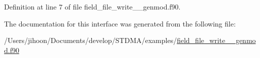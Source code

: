 Definition at line 7 of file field\+\_\+file\+\_\+write\+\_\+\+\_\+genmod.\+f90.



The documentation for this interface was generated from the following file\+:\begin{DoxyCompactItemize}
\item 
/\+Users/jihoon/\+Documents/develop/\+S\+T\+D\+M\+A/examples/\mbox{\hyperlink{field__file__write____genmod_8f90}{field\+\_\+file\+\_\+write\+\_\+\+\_\+genmod.\+f90}}\end{DoxyCompactItemize}

